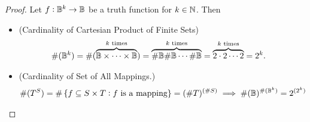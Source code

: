 \begin{proof}
	Let $f:\mathbb{B}^k\to\mathbb{B}$ be a truth function for $k\in\mathbb{N}$. Then
	\begin{itemize}
		\item[] (Cardinality of Cartesian Product of Finite Sets)
		\begin{align*}
			\#(\mathbb{B}^k)&=\#(\overbrace{\mathbb{B}\times\cdots\times\mathbb{B}}^{\text{$k$ times}})
			=\overbrace{\#\mathbb{B}\#\mathbb{B}\cdots\#\mathbb{B}}^{\text{$k$ times}}
			=\overbrace{2\cdot 2\cdots2}^{\text{$k$ times}}
			=2^k.
		\end{align*}
		\item[] (Cardinality of Set of All Mappings.)
		\begin{align*}
			\#(T^S)=\#\set{f\subseteq S\times T:\text{$f$ is a mapping}}=(\# T)^{(\# S)}
			\implies \#(\mathbb{B})^{\#(\mathbb{B}^k)}=2^{(2^k)}
		\end{align*}
	\end{itemize}
\end{proof}

